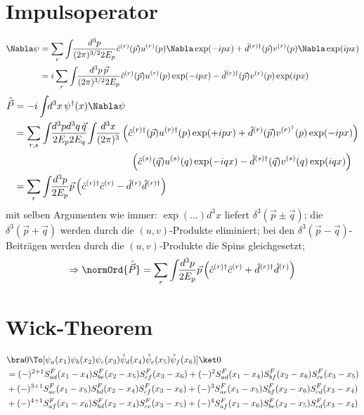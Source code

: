\documentclass[
  ngerman,		%
  a4paper,		%
  11pt,			%
  DIV=12,		%
  parskip=half  	%
]{scrartcl}
\begin{document}
\section{Impulsoperator}
\begin{align*}
\Nabla\psi &= \sum\limits_r\int\!\!\frac{d^3p}{(2\pi)^{3/2}2E_{p}}
 \hat c^{(r)}(\vec p)u^{(r)}(p)\Nabla\exp(-ipx) + \hat d^{(r)\dag}(\vec p)v^{(r)}(p)\Nabla\exp(ipx) \\
 &= i\sum\limits_r\int\!\!\frac{d^3p\,\vec p}{(2\pi)^{3/2}2E_{p}}
 \hat c^{(r)}(\vec p)u^{(r)}(p)\exp(-ipx) - \hat d^{(r)\dag}(\vec p)v^{(r)}(p)\exp(ipx)
\end{align*}
\begin{align*}
\hat {\vec P} &= -i\int\!\!d^3x\,\psi^\dag(x)\Nabla\psi\\
 &= \sum\limits_{r,s}\int\!\!\frac{d^3pd^3q\,\vec q}{2E_{p}2E_q}\!\int\!\!\frac{d^3x}{(2\pi)^3}
 \left( \hat c^{(r)\dag}(\vec p)u^{(r)\dag}(p)\exp(+ipx) + \hat d^{(r)}(\vec p)v^{(r)^\dag}(p)\exp(-ipx) \right)\\
 &\hspace{120pt}\left( \hat c^{(s)}(\vec q)u^{(s)}(q)\exp(-iqx) - \hat d^{(s)\dag}(\vec q)v^{(s)}(q)\exp(iqx) \right)\\
 &= \sum\limits_{r}\int\!\!\frac{d^3p}{2E_{p}} \vec p\left( \hat c^{(r)\dag}\hat c^{(r)} - \hat d^{(r)}\hat d^{(r)\dag}\right)
\end{align*}
mit selben Argumenten wie immer: $\exp(\ldots) d^3x$ liefert $\delta^3(\vec p\pm \vec q)$; die $\delta^3(\vec p+ \vec q)$ werden durch die $(u,v)$-Produkte eliminiert; bei den $\delta^3(\vec p- \vec q)$-Beiträgen werden durch die $(u,v)$-Produkte die Spins gleichgesetzt;
\[ \Rightarrow \normOrd{\hat {\vec P}} = \sum\limits_{r}\int\!\!\frac{d^3p}{2E_{p}} \vec p\left( \hat c^{(r)\dag}\hat c^{(r)} + \hat d^{(r)\dag}\hat d^{(r)}\right) \]

\section{Wick-Theorem}
\begin{align*}
&\bra 0 \To[\psi_a(x_1)\psi_b(x_2)\psi_c(x_3)\hat\psi_d(x_4)\hat\psi_e(x_5)\hat\psi_f(x_6)] \ket 0\\
 &=
  (-)^{2+1} S^F_{ad}(x_1-x_4)S^F_{be}(x_2-x_5)S^F_{cf}(x_3-x_6)
+ (-)^{2}   S^F_{ad}(x_1-x_4)S^F_{bf}(x_2-x_6)S^F_{ce}(x_3-x_5) \\
&+(-)^{3+1} S^F_{ae}(x_1-x_5)S^F_{bd}(x_2-x_4)S^F_{cf}(x_3-x_6)
+ (-)^{3}   S^F_{ae}(x_1-x_5)S^F_{bf}(x_2-x_6)S^F_{cd}(x_3-x_4) \\
&+(-)^{4+1} S^F_{af}(x_1-x_6)S^F_{bd}(x_2-x_4)S^F_{ce}(x_3-x_5)
+ (-)^{4}   S^F_{af}(x_1-x_6)S^F_{be}(x_2-x_5)S^F_{cd}(x_3-x_4) \\
\end{align*}
\end{document}
